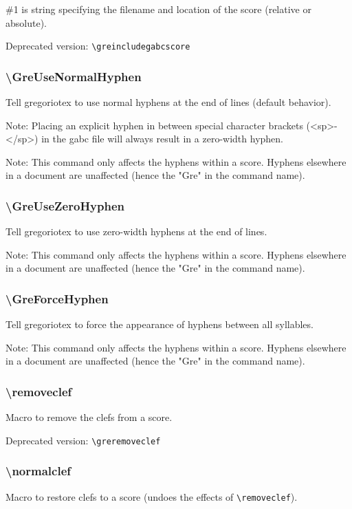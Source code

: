 \#1 is string specifying the filename and location of the score
(relative or absolute).

\smallskip\indent Deprecated version: \verb=\greincludegabcscore=

\subsubsection*{\textbackslash GreUseNormalHyphen}
Tell gregoriotex to use normal hyphens at the end of lines (default
behavior).

Note: Placing an explicit hyphen in between special character brackets
(\ie <sp>-</sp>) in the gabc file will always result in a zero-width
hyphen.

Note: This command only affects the hyphens within a score.  Hyphens
elsewhere in a document are unaffected (hence the "Gre" in the command
name).

\subsubsection*{\textbackslash GreUseZeroHyphen}	
Tell gregoriotex to use zero-width hyphens at the end of lines.

Note: This command only affects the hyphens within a score.  Hyphens
elsewhere in a document are unaffected (hence the "Gre" in the command
name).

\subsubsection*{\textbackslash GreForceHyphen}
Tell gregoriotex to force the appearance of hyphens between all
syllables.

Note: This command only affects the hyphens within a score.  Hyphens
elsewhere in a document are unaffected (hence the "Gre" in the command
name).

\subsubsection*{\textbackslash removeclef}
Macro to remove the clefs from a score.

\smallskip\indent Deprecated version: \verb=\greremoveclef=

\subsubsection*{\textbackslash normalclef}
Macro to restore clefs to a score (undoes the effects of
\verb=\removeclef=).


